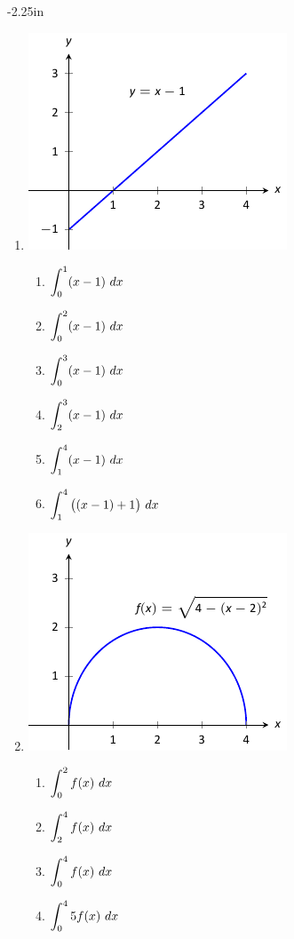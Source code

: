 \begin{adjustwidth*}{}{-2.25in}
\begin{multicols*}{2}
\begin{enumerate}[1),resume]
\item \noindent
\begin{minipage}{\linewidth}
\includegraphics[scale=.8]{figures/fig05_02_ex_08}
\end{minipage}
\bmtwo
\begin{enumerate}
\item		$\ds \int_0^1 (x-1)\ dx$
\item		$\ds \int_0^2 (x-1)\ dx$
\item		$\ds \int_0^3 (x-1)\ dx$
\item		$\ds \int_2^3 (x-1)\ dx$
\item		$\ds \int_1^4 (x-1)\ dx$
\item		$\ds \int_1^4 \big((x-1)+1\big)\ dx$
\end{enumerate}
\emtwo

\item \noindent
\begin{minipage}{\linewidth}
\includegraphics[scale=.8]{figures/fig05_02_ex_09}
\end{minipage}
\bmtwo
\begin{enumerate}
\item		$\displaystyle \int_0^2 f(x)\ dx$
\item		$\displaystyle \int_2^4 f(x)\ dx$
\item		$\displaystyle \int_0^4 f(x)\ dx$
\item		$\ds \int_0^4 5f(x)\ dx$
\end{enumerate}
\emtwo
\end{enumerate}


\end{multicols*}
\end{adjustwidth*}

